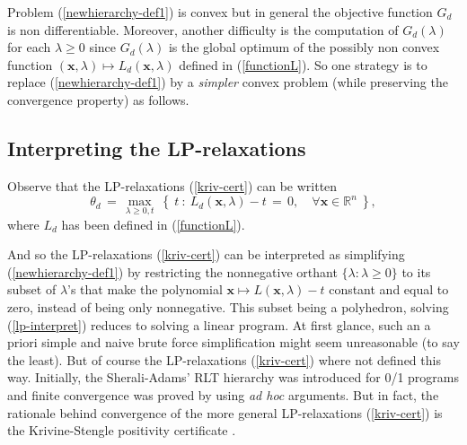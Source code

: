 \documentclass[11pt]{article}
\numberwithin{equation}{section}
\def\x{\mathbf{x}}
\def\R{\mathbb{R}}
\def\N{\mathbb{N}}
\begin{document}
Problem (\ref{newhierarchy-def1}) is convex but in general the objective function $G_d$
is non differentiable. 
Moreover, another difficulty is the computation of $G_d(\lambda)$ for each $\lambda\geq0$
since $G_d(\lambda)$ is the global optimum of the possibly non convex function
$(\x,\lambda)\mapsto L_d(\x,\lambda)$ defined in (\ref{functionL}).
So one strategy is to replace (\ref{newhierarchy-def1}) by a {\it simpler} convex problem (while preserving
the convergence property) as follows.

\subsection{Interpreting the LP-relaxations}
Observe that  the LP-relaxations (\ref{kriv-cert}) can be written
\begin{equation}
\label{lp-interpret}
\theta_d\,=\,\max_{\lambda\geq0,t}\:\left\{\:t\::\: L_d(\x,\lambda)-t\,=\,0,\quad \forall \x\in\R^n\:\right\},
\end{equation}
where $L_d$ has been defined in (\ref{functionL}).

And so the LP-relaxations (\ref{kriv-cert}) can be interpreted as simplifying (\ref{newhierarchy-def1}) by
restricting the nonnegative orthant $\{\lambda: \lambda\geq0\}$ to its subset of
$\lambda$'s that make the polynomial $\x\mapsto L(\x,\lambda)-t$ constant and equal to zero, instead of being only nonnegative. 
This subset being a polyhedron, solving (\ref{lp-interpret}) reduces to solving a linear program.
At first glance, such an a priori simple and naive brute force simplification might seem unreasonable
(to say the least). But of course the LP-relaxations (\ref{kriv-cert}) where not defined this way.
Initially, the Sherali-Adams' RLT hierarchy \cite{SheraliAdams90} was introduced for 0/1 programs and 
finite convergence was proved by using {\it ad hoc} arguments. But in fact, the rationale behind 
convergence of the more general LP-relaxations (\ref{kriv-cert}) is the Krivine-Stengle positivity certificate \cite[Theorem 2.23]{lasserre-imperial}. 
\end{document}

